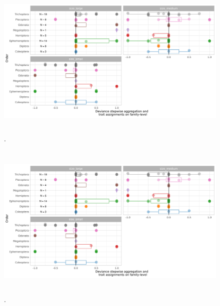 \documentclass{article}
\begin{document}
\begin{figure}[H]
  \centering
  \caption{.}
  \label{fig:trait_dev_stepwise_agg_size}
  \includegraphics[width=14cm, height=7.5cm]{trait_deviations_stepwise_famlvl_size.png}
\end{figure}

\begin{figure}[H]
  \centering
  \caption{.}
  \label{fig:trait_dev_stepwise_agg_volt}
  \includegraphics[width=14cm, height=7.5cm]{trait_deviations_stepwise_famlvl_size.png}
\end{figure}


\end{document}
